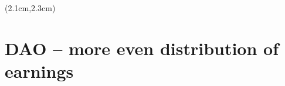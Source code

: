 \begin{preview}
\begin{textblock*}{5cm}(2.1cm,2.3cm) %
	{\color{red}{\large \textcircled{\small \themypage}}}
	\addtocounter{mypage}{1}
\end{textblock*}

\begin{minipage}{\textwidth}
	\setlength{\parskip}{0.4\baselineskip}

\section{DAO -- more even distribution of earnings}

\end{minipage}
\end{preview}


